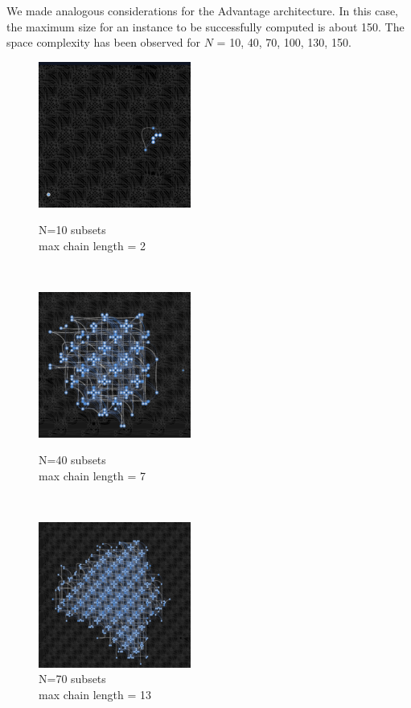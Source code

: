 \documentclass[oneside,a4paper]{article}
\begin{document}
We made analogous considerations for the Advantage architecture. In this case, the maximum size for an instance to be successfully computed is about 150. The space complexity has been observed for $N$ = 10, 40, 70, 100, 130, 150.

\begin{figure}[htp]
\begin{minipage}[b]{4.5cm}

\includegraphics[width=5cm]{LaTeXTemplate/Images/Advantagefirst10.png}
\caption{N=10 subsets\\max chain length = 2}
\end{minipage}
\ \hspace{2mm} \hspace{2mm} \
\begin{minipage}[b]{4.5cm}

\includegraphics[width=5cm]{LaTeXTemplate/Images/Advantagefirst40.png}
\caption{N=40 subsets\\max chain length = 7}
\end{minipage}
\ \hspace{2mm} \hspace{2mm} \
\begin{minipage}[b]{4.5cm}
\centering
\includegraphics[width=5cm]{LaTeXTemplate/Images/Advantagefirst70.png}
\caption{N=70 subsets\\max chain length = 13}
\end{minipage}
\end{figure}
\end{document}
